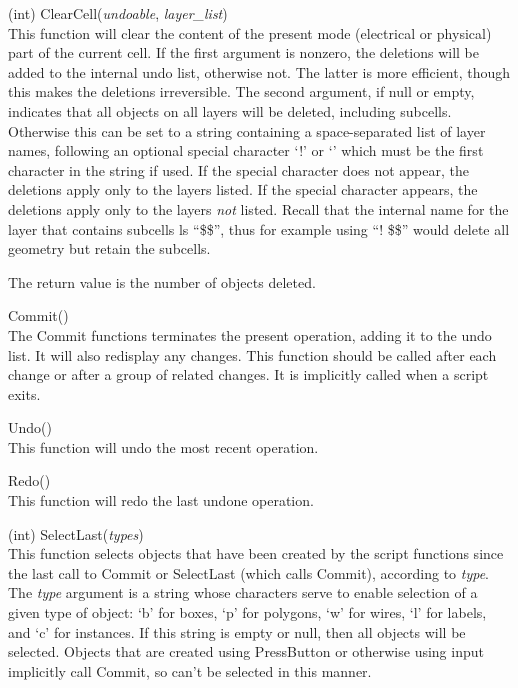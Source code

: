 \begin{description}
\item{(int) \vt ClearCell({\it undoable\/}, {\it layer\_list\/})}\\
This function will clear the content of the present mode (electrical
or physical) part of the current cell.  If the first argument is
nonzero, the deletions will be added to the internal undo list,
otherwise not.  The latter is more efficient, though this makes the
deletions irreversible.  The second argument, if null or empty,
indicates that all objects on all layers will be deleted, including
subcells.  Otherwise this can be set to a string containing a
space-separated list of layer names, following an optional special
character `{\vt !}' or `{\vt {}}' which must be the first
character in the string if used.  If the special character does not
appear, the deletions apply only to the layers listed.  If the special
character appears, the deletions apply only to the layers {\it not}
listed.  Recall that the internal name for the layer that contains
subcells ls ``{\vt \$\$}'', thus for example using ``{\vt !  \$\$}''
would delete all geometry but retain the subcells.

The return value is the number of objects deleted.

\item{\vt Commit()}\\
The Commit functions terminates the present operation, adding it to
the undo list.  It will also redisplay any changes.  This function
should be called after each change or after a group of related
changes.  It is implicitly called when a script exits.

\item{\vt Undo()}\\
This function will undo the most recent operation.

\item{\vt Redo()}\\
This function will redo the last undone operation.

\item{(int) \vt SelectLast({\it types\/})}\\
This function selects objects that have been created by the script
functions since the last call to {\vt Commit} or {\vt SelectLast}
(which calls {\vt Commit}), according to {\it type\/}.  The {\it
type\/} argument is a string whose characters serve to enable
selection of a given type of object:  `{\vt b}' for boxes, `{\vt p}'
for polygons, `{\vt w}' for wires, `{\vt l}' for labels, and `{\vt c}'
for instances.  If this string is empty or null, then all objects will
be selected.  Objects that are created using {\vt PressButton} or
otherwise using {\Xic} input implicitly call {\vt Commit}, so can't be
selected in this manner.
\end{description}


